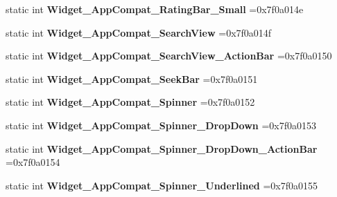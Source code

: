 \begin{DoxyCompactItemize}
static int {\bfseries Widget\+\_\+\+App\+Compat\+\_\+\+Rating\+Bar\+\_\+\+Small} =0x7f0a014e
\item 
\mbox{\label{classandroid_1_1support_1_1v7_1_1mediarouter_1_1R_1_1style_a920a4db8a3126a9bcd44cdf6e7439878}} 
static int {\bfseries Widget\+\_\+\+App\+Compat\+\_\+\+Search\+View} =0x7f0a014f
\item 
\mbox{\label{classandroid_1_1support_1_1v7_1_1mediarouter_1_1R_1_1style_a90570bc8b7272475376cd22fb77a8521}} 
static int {\bfseries Widget\+\_\+\+App\+Compat\+\_\+\+Search\+View\+\_\+\+Action\+Bar} =0x7f0a0150
\item 
\mbox{\label{classandroid_1_1support_1_1v7_1_1mediarouter_1_1R_1_1style_a1f6012c79b993aaad94358c7ea992c22}} 
static int {\bfseries Widget\+\_\+\+App\+Compat\+\_\+\+Seek\+Bar} =0x7f0a0151
\item 
\mbox{\label{classandroid_1_1support_1_1v7_1_1mediarouter_1_1R_1_1style_a5217b2015ba626938d130f9ef95b66d0}} 
static int {\bfseries Widget\+\_\+\+App\+Compat\+\_\+\+Spinner} =0x7f0a0152
\item 
\mbox{\label{classandroid_1_1support_1_1v7_1_1mediarouter_1_1R_1_1style_a97c55349359172e5e490e2c31c1cae9d}} 
static int {\bfseries Widget\+\_\+\+App\+Compat\+\_\+\+Spinner\+\_\+\+Drop\+Down} =0x7f0a0153
\item 
\mbox{\label{classandroid_1_1support_1_1v7_1_1mediarouter_1_1R_1_1style_aefa1b4ec90565404f4c6559a5c326c6b}} 
static int {\bfseries Widget\+\_\+\+App\+Compat\+\_\+\+Spinner\+\_\+\+Drop\+Down\+\_\+\+Action\+Bar} =0x7f0a0154
\item 
\mbox{\label{classandroid_1_1support_1_1v7_1_1mediarouter_1_1R_1_1style_a93b1c01bd50dc2c3a5dc55c406f4cfba}} 
static int {\bfseries Widget\+\_\+\+App\+Compat\+\_\+\+Spinner\+\_\+\+Underlined} =0x7f0a0155
\item 

\end{DoxyCompactItemize}
